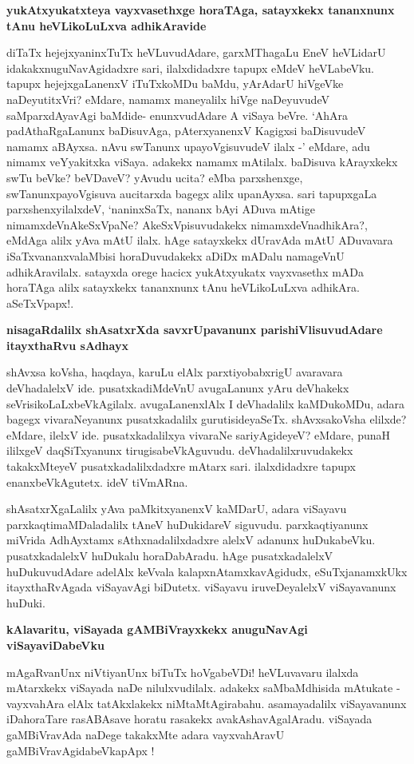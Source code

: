 \noindent
{\bf\large{yukAtxyukatxteya vayxvasethxge horaTAga, satayxkekx tananxnunx tAnu heVLikoLuLxva adhikAravide}}\label{249}

diTaTx hejejxyaninxTuTx heVLuvudAdare, garxMThagaLu EneV heVLidarU idakakxnuguNavAgidadxre sari, ilalxdidadxre tapupx eMdeV heVLabeVku. tapupx hejejxgaLanenxV iTuTxkoMDu baMdu, yArAdarU hiVgeVke naDeyutitxVri? eMdare, namamx maneyalilx hiVge naDeyuvudeV saMparxdAyavAgi baMdide- enunxvudAdare A viSaya beVre. `AhAra padAthaRgaLanunx baDisuvAga, pAterxyanenxV Kagigxsi baDisuvudeV namamx aBAyxsa. nAvu swTanunx upayoVgisuvudeV ilalx -' eMdare, adu nimamx veYyakitxka viSaya. adakekx namamx mAtilalx. baDisuva kArayxkekx swTu beVke? beVDaveV? yAvudu ucita? eMba parxshenxge, swTanunxpayoVgisuva aucitarxda bagegx alilx upanAyxsa. sari tapupxgaLa parxshenxyilalxdeV, `naninxSaTx, nananx bAyi ADuva mAtige nimamxdeVnAkeSxVpaNe? AkeSxVpisuvudakekx nimamxdeVnadhikAra?, eMdAga alilx yAva mAtU ilalx. hAge satayxkekx dUravAda mAtU ADuvavara iSaTxvananxvalaMbisi horaDuvudakekx aDiDx mADalu namageVnU adhikAravilalx. satayxda orege hacicx yukAtxyukatx vayxvasethx mADa horaTAga alilx satayxkekx tananxnunx tAnu heVLikoLuLxva adhikAra. aSeTxVpapx!.

\noindent
{\bf\large{nisagaRdalilx shAsatxrXda savxrUpavanunx parishiVlisuvudAdare itayxthaRvu sAdhayx}}\label{page249}

shAvxsa koVsha, haqdaya, karuLu elAlx parxtiyobabxrigU avaravara deVhadalelxV ide. pusatxkadiMdeVnU avugaLanunx yAru deVhakekx seVrisikoLaLxbeVkAgilalx. avugaLanenxlAlx I deVhadalilx kaMDukoMDu, adara bagegx vivaraNeyanunx pusatxkadalilx gurutisideyaSeTx. shAvxsakoVsha elilxde? eMdare, ilelxV ide. pusatxkadalilxya vivaraNe sariyAgideyeV? eMdare, punaH ililxgeV daqSiTxyanunx tirugisabeVkAguvudu. deVhadalilxruvudakekx takakxMteyeV pusatxkadalilxdadxre mAtarx sari. ilalxdidadxre tapupx enanxbeVkAgutetx. ideV tiVmARna.

shAsatxrXgaLalilx yAva paMkitxyanenxV kaMDarU, adara viSayavu parxkaqtimaMDaladalilx tAneV huDukidareV siguvudu. parxkaqtiyanunx miVrida AdhAyxtamx sAthxnadalilxdadxre alelxV adanunx huDukabeVku. pusatxkadalelxV huDukalu horaDabAradu. hAge pusatxkadalelxV huDukuvudAdare adelAlx keVvala kalapxnAtamxkavAgidudx, eSuTxjanamxkUkx itayxthaRvAgada viSayavAgi biDutetx. viSayavu iruveDeyalelxV viSayavanunx huDuki.

\noindent
{\bf\large{kAlavaritu, viSayada gAMBiVrayxkekx anuguNavAgi viSayaviDabeVku}}\label{page250}

mAgaRvanUnx niVtiyanUnx biTuTx hoVgabeVDi! heVLuvavaru ilalxda mAtarxkekx viSayada naDe nilulxvudilalx. adakekx saMbaMdhisida mAtukate - vayxvahAra elAlx tatAkxlakekx niMtaMtAgirabahu. asamayadalilx viSayavanunx iDahoraTare rasABAsave horatu rasakekx avakAshavAgalAradu. viSayada gaMBiVravAda naDege takakxMte adara vayxvahAravU gaMBiVravAgidabeVkapApx !


